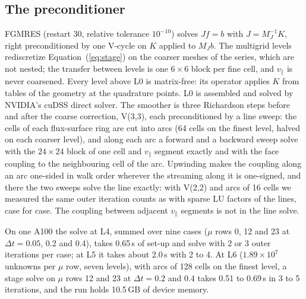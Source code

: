 \documentclass[11pt]{article}
\newcommand{\vpar}{v_\parallel}
\begin{document}
\subsection{The preconditioner}
\label{sec:pc}
FGMRES (restart 30, relative tolerance $10^{-10}$) solves $J f = b$ with $J = M_J^{-1} K$, right
preconditioned by one V-cycle on $K$ applied to $M_J b$.  The multigrid levels rediscretize
Equation~(\ref{eq:stage}) on the coarser meshes of the series, which are not nested; the transfer
between levels is one $6 \times 6$ block per fine cell, and $\vpar$ is never coarsened.  Every
level above L0 is matrix-free: its operator applies $K$ from tables of the geometry at the
quadrature points.  L0 is assembled and solved by NVIDIA's cuDSS direct solver.  The smoother is
three Richardson steps before and after the coarse correction, V(3,3), each preconditioned by a
line sweep: the cells of each flux-surface ring are cut into arcs (64 cells on the finest level,
halved on each coarser level), and along each arc a forward and a backward sweep solve with the
$24 \times 24$ block of one cell and $\vpar$ segment exactly and with the face coupling to the
neighbouring cell of the arc.  Upwinding makes the coupling along an arc one-sided in walk
order wherever the streaming along it is one-signed, and there the two sweeps solve the line
exactly: with V(2,2) and arcs of 16 cells we measured the same outer iteration counts as with
sparse LU factors of the lines, case for case.  The coupling between adjacent $\vpar$ segments
is not in the line solve.

On one A100 the solve at L4, summed over nine cases ($\mu$ rows 0, 12 and 23 at
$\Delta t = 0.05$, 0.2 and 0.4), takes 0.65\,s of set-up and solve with 2 or 3 outer iterations
per case; at L5 it takes about 2.0\,s with 2 to 4.  At L6 ($1.89 \times 10^7$ unknowns per
$\mu$ row, seven levels), with arcs of 128 cells on the finest level, a stage solve on $\mu$ rows 12
and 23 at $\Delta t = 0.2$ and 0.4 takes 0.51 to 0.69\,s in 3 to 5 iterations, and the run holds
10.5\,GB of device memory.
\end{document}

